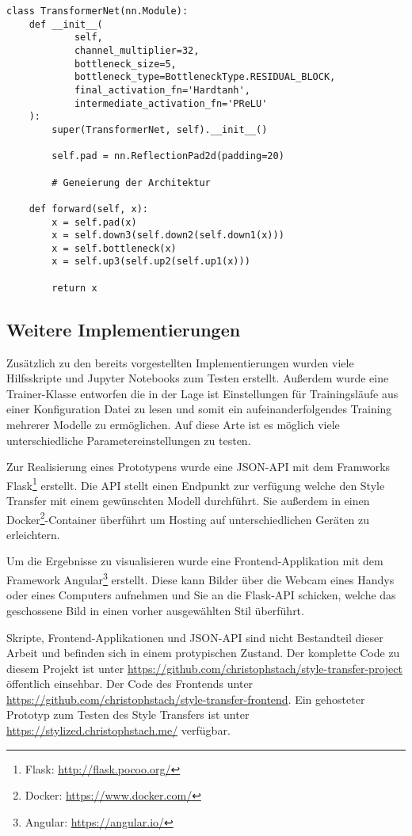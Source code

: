\begin{listing}[H]
\begin{verbatim}
class TransformerNet(nn.Module):
    def __init__(
            self,
            channel_multiplier=32,
            bottleneck_size=5,
            bottleneck_type=BottleneckType.RESIDUAL_BLOCK,
            final_activation_fn='Hardtanh',
            intermediate_activation_fn='PReLU'
    ):
        super(TransformerNet, self).__init__()

        self.pad = nn.ReflectionPad2d(padding=20)

        # Geneierung der Architektur

    def forward(self, x):
        x = self.pad(x)
        x = self.down3(self.down2(self.down1(x)))
        x = self.bottleneck(x)
        x = self.up3(self.up2(self.up1(x)))

        return x
\end{verbatim}
\end{listing}

\pagebreak

\subsection{Weitere Implementierungen}

Zusätzlich zu den bereits vorgestellten Implementierungen wurden viele Hilfsskripte und Jupyter Notebooks zum Testen erstellt.
Außerdem wurde eine Trainer-Klasse entworfen die in der Lage ist Einstellungen für Trainingsläufe aus einer Konfiguration Datei zu lesen und somit 
ein aufeinanderfolgendes Training mehrerer Modelle zu ermöglichen. Auf diese Arte ist es möglich viele unterschiedliche Parametereinstellungen zu testen.

Zur Realisierung eines Prototypens wurde eine JSON-API mit dem Framworks Flask\footnote{Flask: \url{http://flask.pocoo.org/}} erstellt. Die API stellt einen Endpunkt zur verfügung welche den Style Transfer mit einem gewünschten Modell durchführt. Sie außerdem in einen Docker\footnote{Docker: \url{https://www.docker.com/}}-Container überführt um Hosting auf unterschiedlichen Geräten zu erleichtern.

Um die Ergebnisse zu visualisieren wurde eine Frontend-Applikation mit dem Framework Angular\footnote{Angular: \url{https://angular.io/}} erstellt. Diese kann Bilder über die Webcam eines Handys oder eines Computers aufnehmen und Sie an die Flask-API schicken, welche das geschossene Bild in einen vorher ausgewählten Stil überführt.

Skripte, Frontend-Applikationen und JSON-API sind nicht Bestandteil dieser Arbeit und befinden sich in einem protypischen Zustand. Der komplette Code zu diesem Projekt ist unter \url{https://github.com/christophstach/style-transfer-project} öffentlich einsehbar. Der Code des Frontends unter \url{https://github.com/christophstach/style-transfer-frontend}. Ein gehosteter Prototyp zum Testen des Style Transfers ist unter \url{https://stylized.christophstach.me/} verfügbar.